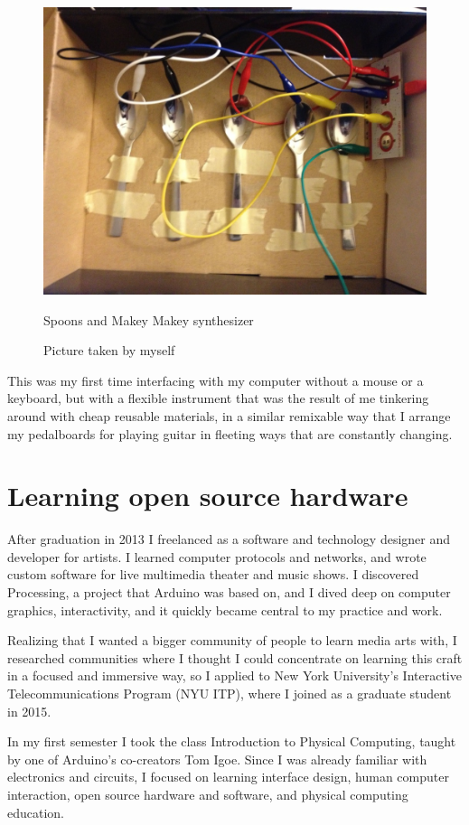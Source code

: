\begin{figure}[ht]
  \centering
  \includegraphics[width=0.75\linewidth,height=0.25\textheight,keepaspectratio]{images/makey-makey-spoons.jpg}
  \caption{Spoons and Makey Makey synthesizer}
  \caption*{Picture taken by myself}
  \label{fig:makey-makey-spoons}
\end{figure}

This was my first time interfacing with my computer without a mouse or a keyboard, but with a flexible instrument that was the result of me tinkering around with cheap reusable materials, in a similar remixable way that I arrange my pedalboards for playing guitar in fleeting ways that are constantly changing.

\section{Learning open source hardware}

After graduation in 2013 I freelanced as a software and technology designer and developer for artists. I learned computer protocols and networks, and wrote custom software for live multimedia theater and music shows. I discovered Processing, a project that Arduino was based on, and I dived deep on computer graphics, interactivity, and it quickly became central to my practice and work.

Realizing that I wanted a bigger community of people to learn media arts with, I researched communities where I thought I could concentrate on learning this craft in a focused and immersive way, so I applied to New York University's Interactive Telecommunications Program (\acrshort{NYU} \acrshort{ITP}), where I joined as a graduate student in 2015. 

In my first semester I took the class Introduction to Physical Computing, taught by one of Arduino's co-creators Tom Igoe. Since I was already familiar with electronics and circuits, I focused on learning interface design, human computer interaction, open source hardware and software, and physical computing education.

